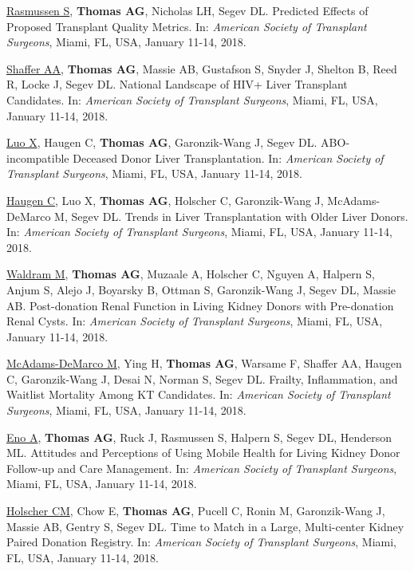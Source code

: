 \documentclass[10pt]{article}
\makeatletter
\newlength{\bibhang}
\newlength{\bibsep}
 {\@listi \global\bibsep\itemsep \global\advance\bibsep by\parsep}
\newenvironment{bibenum*}
  {\renewcommand\labelenumi{[\theenumi]}%
   \etaremune[
     topsep=0pt,
     itemsep=\bibsep,
     parsep=0pt,partopsep=0pt,
     itemindent=-\bibhang,
     leftmargin={\bibhang+\widthof{[999]}}]}
  {\endetaremune}
\makeatother
\begin{document}
\begin{bibenum*}
\item \underline{Rasmussen S}, \textbf{Thomas AG}, Nicholas LH, Segev DL.
  Predicted Effects of Proposed Transplant Quality Metrics.
  In: \emph{American Society of Transplant Surgeons},
  Miami, FL, USA, January 11-14, 2018.

\item \underline{Shaffer AA}, \textbf{Thomas AG}, Massie AB,
  Gustafson S, Snyder J, Shelton B, Reed R, Locke J, Segev DL.
  National Landscape of HIV+ Liver Transplant
  Candidates. In: \emph{American Society of Transplant Surgeons},
  Miami, FL, USA, January 11-14, 2018.

\item \underline{Luo X}, Haugen C, \textbf{Thomas AG}, Garonzik-Wang J,
  Segev DL.
  ABO-incompatible Deceased Donor Liver Transplantation.
  In: \emph{American Society of Transplant Surgeons},
  Miami, FL, USA, January 11-14, 2018.

\item \underline{Haugen C}, Luo X, \textbf{Thomas AG}, Holscher C,
  Garonzik-Wang J, McAdams-DeMarco M, Segev DL.
  Trends in Liver Transplantation with Older Liver Donors.
  In: \emph{American Society of Transplant Surgeons},
  Miami, FL, USA, January 11-14, 2018.

\item \underline{Waldram M}, \textbf{Thomas AG}, Muzaale A,
  Holscher C, Nguyen A, Halpern S, Anjum S, Alejo J, Boyarsky B, Ottman S,
  Garonzik-Wang J, Segev DL, Massie AB. Post-donation Renal Function in Living
  Kidney Donors with Pre-donation Renal Cysts.
  In: \emph{American Society of Transplant Surgeons},
  Miami, FL, USA, January 11-14, 2018.

\item \underline{McAdams-DeMarco M}, Ying H, \textbf{Thomas AG}, Warsame F,
  Shaffer AA, Haugen C, Garonzik-Wang J, Desai N, Norman S, Segev DL.
  Frailty, Inflammation, and Waitlist Mortality Among KT Candidates.
  In: \emph{American Society of Transplant Surgeons},
  Miami, FL, USA, January 11-14, 2018.

\item \underline{Eno A}, \textbf{Thomas AG}, Ruck J, Rasmussen S, Halpern S,
  Segev DL, Henderson ML. Attitudes and Perceptions of Using Mobile Health
  for Living Kidney Donor Follow-up and Care Management.
  In: \emph{American Society of Transplant Surgeons},
  Miami, FL, USA, January 11-14, 2018.

\item \underline{Holscher CM}, Chow E, \textbf{Thomas AG}, Pucell C, Ronin M,
  Garonzik-Wang J, Massie AB, Gentry S, Segev DL. Time to Match in a Large,
  Multi-center Kidney Paired Donation Registry.
  In: \emph{American Society of Transplant Surgeons},
  Miami, FL, USA, January 11-14, 2018.


\end{bibenum*}
\end{document}
